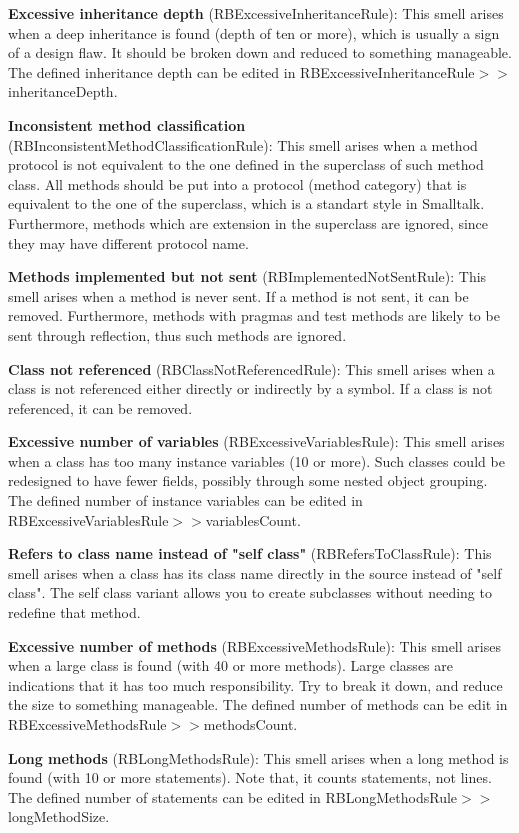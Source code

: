 \textbf{Excessive inheritance depth} (RBExcessiveInheritanceRule): This smell arises when a deep inheritance is found (depth of ten or more), which is usually a sign of a design flaw. It should be broken down and reduced to something manageable. The defined inheritance depth can be edited in RBExcessiveInheritanceRule$>>$inheritanceDepth.

\textbf{Inconsistent method classification} (RBInconsistentMethodClassificationRule): This smell arises when a method protocol is not equivalent to the one defined in the superclass of such method class. All methods should be put into a protocol (method category) that is equivalent to the one of the superclass, which is a standart style in Smalltalk. Furthermore, methods which are extension in the superclass are ignored, since they may have different protocol name.

\textbf{Methods implemented but not sent} (RBImplementedNotSentRule): This smell arises when a method is never sent. If a method is not sent, it can be removed. Furthermore, methods with pragmas and test methods are likely to be sent through reflection, thus such methods are ignored.

\textbf{Class not referenced} (RBClassNotReferencedRule): This smell arises when a class is not referenced either directly or indirectly by a symbol. If a class is not referenced, it can be removed.

\textbf{Excessive number of variables} (RBExcessiveVariablesRule): This smell arises when a class has too many instance variables (10 or more). Such classes could be redesigned to have fewer fields, possibly through some nested object grouping. The defined number of instance variables can be edited in RBExcessiveVariablesRule$>>$variablesCount.

\textbf{Refers to class name instead of "self class"} (RBRefersToClassRule): This smell arises when a class has its class name directly in the source instead of "self class". The self class variant allows you to create subclasses without needing to redefine that method.

\textbf{Excessive number of methods} (RBExcessiveMethodsRule): This smell arises when a large class is found (with 40 or more methods). Large classes are indications that it has too much responsibility. Try to break it down, and reduce the size to something manageable. The defined number of methods can be edit in RBExcessiveMethodsRule$>>$methodsCount.

\textbf{Long methods} (RBLongMethodsRule): This smell arises when a long method is found (with 10 or more statements). Note that, it counts statements, not lines. The defined number of statements can be edited in RBLongMethodsRule$>>$longMethodSize.

